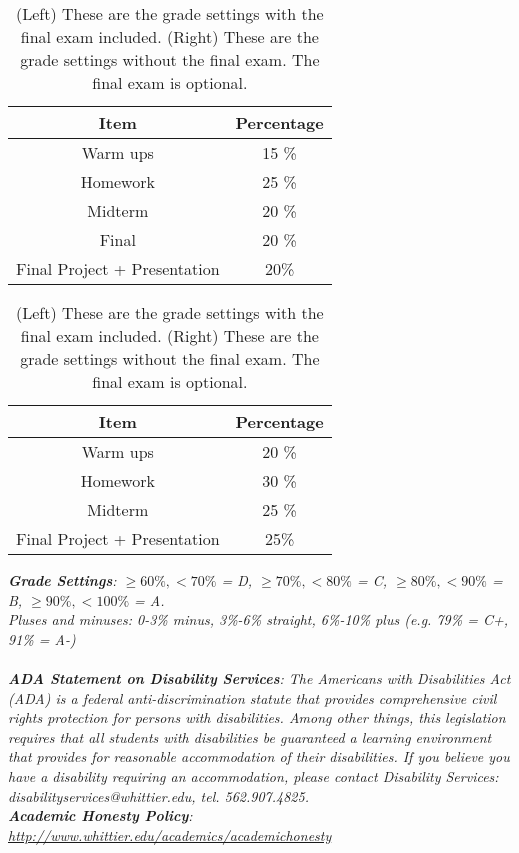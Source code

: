 \documentclass[10pt]{article}
\begin{document}
\begin{table}[h]
\centering
\begin{tabular}{| c | c |}
\hline
Item & Percentage \\ \hline \hline
Warm ups & 15 \% \\ \hline
Homework & 25 \% \\ \hline
Midterm & 20 \% \\ \hline
Final & 20 \% \\ \hline
Final Project + Presentation & 20\% \\ \hline
\end{tabular}
\begin{tabular}{| c | c |}
\hline
Item & Percentage \\ \hline \hline
Warm ups & 20 \% \\ \hline
Homework & 30 \% \\ \hline
Midterm & 25 \% \\ \hline
Final Project + Presentation & 25\% \\ \hline
\end{tabular}
\caption{\label{tab:grades} (Left) These are the grade settings with the final exam included. (Right) These are the grade settings without the final exam.  The final exam is optional.}
\end{table}
\vspace{0.5cm}
\textit{\textbf{Grade Settings}: $\geq 60\%, <70\%$ = D, $\geq 70\%, <80\%$ = C, $\geq 80\%, <90\%$ = B, $\geq 90\%, <100\%$ = A.  \\ Pluses and minuses: 0-3\% minus, 3\%-6\% straight, 6\%-10\% plus (e.g. 79\% = C+, 91\% = A-)} \\ \\
\textit{\textbf{ADA Statement on Disability Services}: The Americans with Disabilities Act (ADA) is a federal anti-discrimination statute that provides comprehensive civil rights protection for persons with disabilities. Among other things, this legislation requires that all students with disabilities be guaranteed a learning environment that provides for reasonable accommodation of their disabilities. If you believe you have a disability requiring an accommodation, please contact Disability Services: disabilityservices@whittier.edu, tel. 562.907.4825.} \\
\textit{\textbf{Academic Honesty Policy}: \url{http://www.whittier.edu/academics/academichonesty}}

\clearpage
\end{document}
